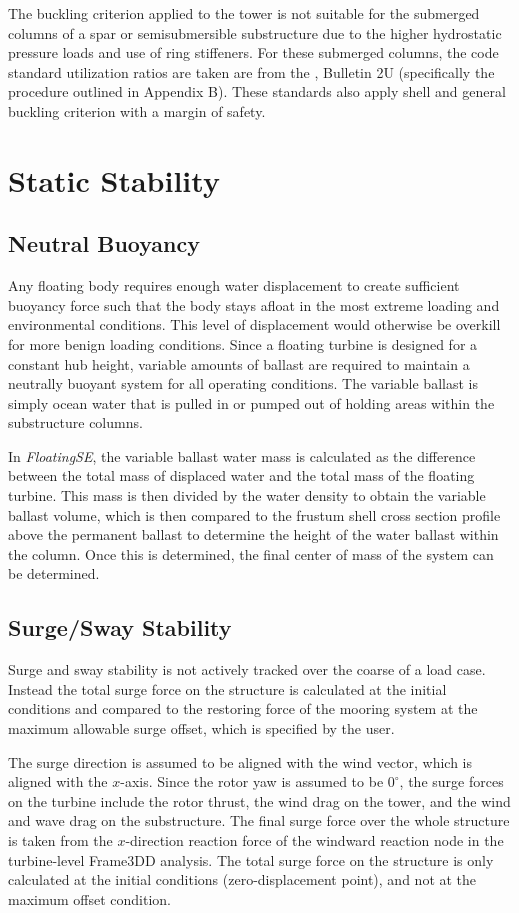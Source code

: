 The buckling criterion applied to the tower is not suitable for the
submerged columns of a spar or semisubmersible substructure due to the
higher hydrostatic pressure loads and use of ring stiffeners.  For these
submerged columns, the code standard utilization ratios are taken are
from the \citet{api2U}, Bulletin 2U (specifically the procedure outlined
in Appendix B).  These standards also apply shell and general buckling
criterion with a margin of safety.


\section{Static Stability}
\label{sec:static}
\subsection{Neutral Buoyancy}
Any floating body requires enough water displacement to create
sufficient buoyancy force such that the body stays afloat in the most
extreme loading and environmental conditions.  This level of
displacement would otherwise be overkill for more benign loading
conditions.  Since a floating turbine is designed for a constant hub
height, variable amounts of ballast are required to maintain a neutrally
buoyant system for all operating conditions.  The variable ballast is
simply ocean water that is pulled in or pumped out of holding areas
within the substructure columns.

In \textit{FloatingSE}, the variable ballast water mass is calculated as
the difference between the total mass of displaced water and the total
mass of the floating turbine.  This mass is then divided by the water
density to obtain the variable ballast volume, which is then compared to
the frustum shell cross section profile above the permanent ballast to
determine the height of the water ballast within the column.  Once this
is determined, the final center of mass of the system can be determined.

\subsection{Surge/Sway Stability}
Surge and sway stability is not actively tracked over the coarse of a
load case.  Instead the total surge force on the structure is calculated
at the initial conditions and compared to the restoring force of the
mooring system at the maximum allowable surge offset, which is specified
by the user.

The surge direction is assumed to be aligned with the wind vector, which
is aligned with the $x$-axis.  Since the rotor yaw is assumed to be
$0^{\circ}$, the surge forces on the turbine include the rotor thrust,
the wind drag on the tower, and the wind and wave drag on the
substructure.  The final surge force over the whole structure is taken
from the $x$-direction reaction force of the windward reaction node in
the turbine-level Frame3DD analysis.  The total surge force on the
structure is only calculated at the initial conditions
(zero-displacement point), and not at the maximum offset condition.

